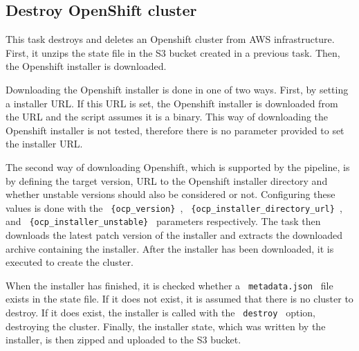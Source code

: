\subsection{Destroy OpenShift cluster}\label{subsec:destroy-openshift-cluster}

This task destroys and deletes an Openshift cluster from AWS infrastructure.
First, it unzips the state file in the S3 bucket created in a previous task.
Then, the Openshift installer is downloaded.

Downloading the Openshift installer is done in one of two ways.
First, by setting a installer URL.
If this URL is set, the Openshift installer is downloaded from the URL and the script assumes it is a binary.
This way of downloading the Openshift installer is not tested, therefore there is no parameter provided to set the installer URL.

The second way of downloading Openshift, which is supported by the pipeline, is by defining the target version, URL to the Openshift installer directory and whether unstable versions should also be considered or not.
Configuring these values is done with the \verb| {ocp_version} |, \verb| {ocp_installer_directory_url} |, and \verb| {ocp_installer_unstable} | parameters respectively.
The task then downloads the latest patch version of the installer and extracts the downloaded archive containing the installer.
After the installer has been downloaded, it is executed to create the cluster.

When the installer has finished, it is checked whether a \verb| metadata.json | file exists in the state file.
If it does not exist, it is assumed that there is no cluster to destroy.
If it does exist, the installer is called with the \verb| destroy | option, destroying the cluster.
Finally, the installer state, which was written by the installer, is then zipped and uploaded to the S3 bucket.
